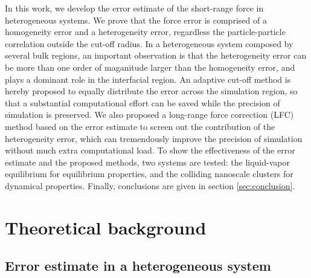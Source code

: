 \documentclass[aps,pre,preprint]{revtex4}
\begin{document}
In this work, we develop the error estimate of the short-range force
in heterogeneous systems. We prove that the 
force error is comprised of a homogeneity error and a heterogeneity
error, regardless the particle-particle correlation outside the
cut-off radius.  In a heterogeneous system composed by several bulk
regions, an important observation is that the heterogeneity error can
be more than one order of maganitude larger than the homogeneity
error, and plays a dominant role in the interfacial region. An
adaptive cut-off method is hereby proposed to equally distribute the
error across the simulation region, so that a substantial
computational effort can be saved while the precision of simulation is
preserved. We also proposed a long-range force correction (LFC) method
based on the error estimate to screen out the contribution of the
heterogeneity error, which can tremendously improve the precision of
simulation without much extra computational load. To show the
effectiveness of the error estimate and the proposed methods, two
systems are tested: the liquid-vapor equilibrium for equilibrium
properties, and the colliding nanoscale clusters for dynamical
properties. Finally, conclusions are given in section
\ref{sec:conclusion}.




\section{Theoretical background}
\subsection{Error estimate in a heterogeneous system}
\end{document}
